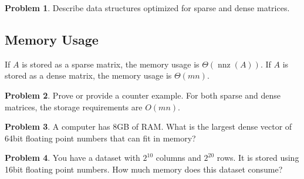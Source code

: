 \documentclass[10pt]{article}
\theoremstyle{definition}
\newtheorem{problem}{Problem}
\DeclareMathOperator{\nnz}{nnz}
\begin{document}
\begin{problem}
    Describe data structures optimized for sparse and dense matrices.
\end{problem}

\newpage
\subsection{Memory Usage}

If $A$ is stored as a sparse matrix,
the memory usage is $\Theta(\nnz(A))$.
If $A$ is stored as a dense matrix,
the memory usage is $\Theta(mn)$.

\begin{problem}
    Prove or provide a counter example.
    For both sparse and dense matrices,
    the storage requirements are $O(mn)$.
    \vspace{4in}
\end{problem}

\newpage
\begin{problem}
    A computer has 8GB of RAM.
    What is the largest dense vector of 64bit floating point numbers that can fit in memory?
    \vspace{4in}
\end{problem}

\begin{problem}
    You have a dataset with $2^{10}$ columns and $2^{20}$ rows.
    It is stored using 16bit floating point numbers.
    How much memory does this dataset consume?
    \vspace{4in}
\end{problem}
\end{document}
